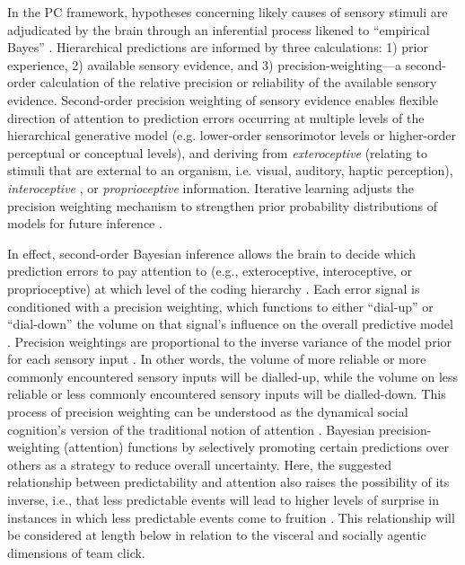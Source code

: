 \begin{CJK}{UTF8}{gbsn}
In the PC framework, hypotheses concerning likely causes of sensory stimuli are adjudicated by the brain through an inferential process likened to ``empirical Bayes'' \citep{Clark2013}.  Hierarchical predictions are informed by three calculations: 1) prior experience, 2) available sensory evidence, and 3) precision-weighting---a second-order calculation of the relative precision or reliability of the available sensory evidence.  Second-order precision weighting of sensory evidence enables flexible direction of attention to prediction errors occurring at multiple levels of the hierarchical generative model (e.g. lower-order sensorimotor levels or higher-order perceptual or conceptual levels), and deriving from \textit{exteroceptive} (relating to stimuli that are external to an organism, i.e. visual, auditory, haptic perception), \textit{interoceptive} \citep[relating to stimuli produced within an organism, particularly by the body's organs (viscera) e.g., ``gut feelings,'' or elevated heart rate; see][]{Seth2013,FeldmanBarrett2015}, or \textit{proprioceptive} \citep[relating to stimuli that are produced and perceived within an organism, especially those connected with the position and movement of the body; see][]{Friston2011a} information.  Iterative learning adjusts the precision weighting mechanism to strengthen prior probability distributions of models for future inference \citep{Robbins1964}.

In effect, second-order Bayesian inference allows the brain to decide which prediction errors to pay attention to (e.g., exteroceptive, interoceptive, or proprioceptive) at which level of the coding hierarchy \citep[for example, higher conceptual errors or lower sensorimotor errors;][]{Friston2015}.  Each error signal is conditioned with a precision weighting, which functions to either ``dial-up'' or ``dial-down'' the volume on that signal's influence on the overall predictive model \citep{Clark2015}.  Precision weightings are proportional to the inverse variance of the model prior for each sensory input \citep{Ernst2004,FitzGerald2014}.  In other words, the volume of more reliable or more commonly encountered sensory inputs will be dialled-up, while the volume on less reliable or less commonly encountered sensory inputs will be dialled-down. This process of precision weighting can be understood as the dynamical social cognition's version of the traditional notion of attention \citep{Ramstead2016}. Bayesian precision-weighting (attention) functions by selectively promoting certain predictions over others as a strategy to reduce overall uncertainty.
Here, the suggested relationship between predictability and attention also raises the possibility of its inverse, i.e., that less predictable events will lead to higher levels of surprise in instances in which less predictable events come to fruition \citep{Chetverikov2016}.  This relationship will be considered at length below in relation to the visceral and socially agentic dimensions of team click.


\end{CJK}
